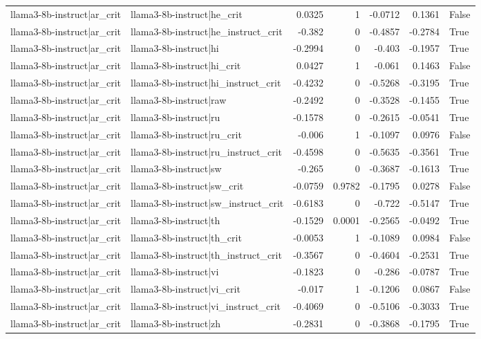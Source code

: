 \begin{table}
\begin{tabular}{l l r r r r l}
llama3-8b-instruct|ar_crit & llama3-8b-instruct|he_crit & 0.0325 & 1 & -0.0712 & 0.1361 & False \\
llama3-8b-instruct|ar_crit & llama3-8b-instruct|he_instruct_crit & -0.382 & 0 & -0.4857 & -0.2784 & True \\
llama3-8b-instruct|ar_crit & llama3-8b-instruct|hi & -0.2994 & 0 & -0.403 & -0.1957 & True \\
llama3-8b-instruct|ar_crit & llama3-8b-instruct|hi_crit & 0.0427 & 1 & -0.061 & 0.1463 & False \\
llama3-8b-instruct|ar_crit & llama3-8b-instruct|hi_instruct_crit & -0.4232 & 0 & -0.5268 & -0.3195 & True \\
llama3-8b-instruct|ar_crit & llama3-8b-instruct|raw & -0.2492 & 0 & -0.3528 & -0.1455 & True \\
llama3-8b-instruct|ar_crit & llama3-8b-instruct|ru & -0.1578 & 0 & -0.2615 & -0.0541 & True \\
llama3-8b-instruct|ar_crit & llama3-8b-instruct|ru_crit & -0.006 & 1 & -0.1097 & 0.0976 & False \\
llama3-8b-instruct|ar_crit & llama3-8b-instruct|ru_instruct_crit & -0.4598 & 0 & -0.5635 & -0.3561 & True \\
llama3-8b-instruct|ar_crit & llama3-8b-instruct|sw & -0.265 & 0 & -0.3687 & -0.1613 & True \\
llama3-8b-instruct|ar_crit & llama3-8b-instruct|sw_crit & -0.0759 & 0.9782 & -0.1795 & 0.0278 & False \\
llama3-8b-instruct|ar_crit & llama3-8b-instruct|sw_instruct_crit & -0.6183 & 0 & -0.722 & -0.5147 & True \\
llama3-8b-instruct|ar_crit & llama3-8b-instruct|th & -0.1529 & 0.0001 & -0.2565 & -0.0492 & True \\
llama3-8b-instruct|ar_crit & llama3-8b-instruct|th_crit & -0.0053 & 1 & -0.1089 & 0.0984 & False \\
llama3-8b-instruct|ar_crit & llama3-8b-instruct|th_instruct_crit & -0.3567 & 0 & -0.4604 & -0.2531 & True \\
llama3-8b-instruct|ar_crit & llama3-8b-instruct|vi & -0.1823 & 0 & -0.286 & -0.0787 & True \\
llama3-8b-instruct|ar_crit & llama3-8b-instruct|vi_crit & -0.017 & 1 & -0.1206 & 0.0867 & False \\
llama3-8b-instruct|ar_crit & llama3-8b-instruct|vi_instruct_crit & -0.4069 & 0 & -0.5106 & -0.3033 & True \\
llama3-8b-instruct|ar_crit & llama3-8b-instruct|zh & -0.2831 & 0 & -0.3868 & -0.1795 & True \\

\end{tabular}
\end{table}
